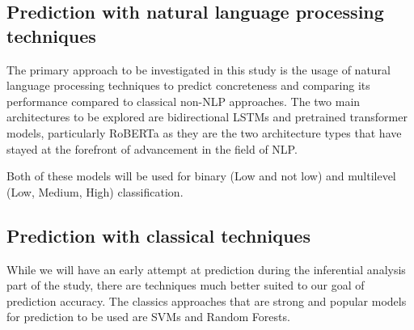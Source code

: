 \documentclass[12pt, a4paper]{article}
\begin{document}
\subsection{Prediction with natural language processing techniques}

The primary approach to be investigated in this study is the usage of natural language processing techniques to predict concreteness and comparing its performance compared to classical non-NLP approaches. The two main architectures to be explored are bidirectional LSTMs \cite{bilstm} and pretrained transformer models, particularly RoBERTa \cite{roberta} as they are the two architecture types that have stayed at the forefront of advancement in the field of NLP. 

Both of these models will be used for binary (Low and not low) and multilevel (Low, Medium, High) classification.

\subsection{Prediction with classical techniques}

While we will have an early attempt at prediction during the inferential analysis part of the study, there are techniques much better suited to our goal of prediction accuracy. The classics approaches that are strong and popular models for prediction to be used are SVMs and Random Forests.
\end{document}
